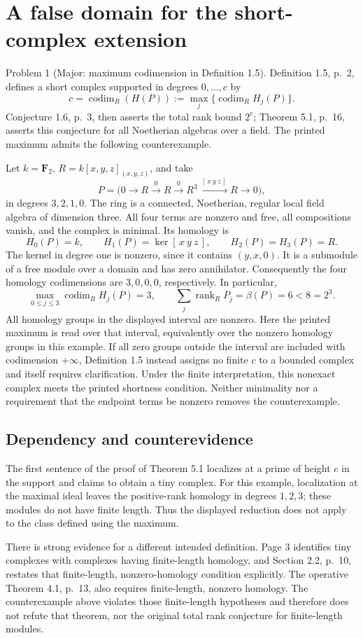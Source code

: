 \documentclass[10pt]{article}
\begin{document}
\section*{A false domain for the short-complex extension}
Problem 1 (Major: maximum codimension in Definition 1.5).  Definition 1.5, p. 2, defines a short complex supported in degrees \(0,\ldots,c\) by \[c=\operatorname{codim}_R(H(P)):=\max_j\{\operatorname{codim}_R H_j(P)\}.\] Conjecture 1.6, p. 3, then asserts the total rank bound \(2^c\); Theorem 5.1, p. 16, asserts this conjecture for all Noetherian algebras over a field. The printed maximum admits the following counterexample.\par
Let \(k=\mathbf F_2\), \(R=k[x,y,z]_{(x,y,z)}\), and take \[P=\bigl(0\longrightarrow R
       \xrightarrow{\,0\,}R
       \xrightarrow{\,0\,}R^3
       \xrightarrow{\,[\,x\ y\ z\,]\,}R
       \longrightarrow0\bigr),\] in degrees \(3,2,1,0\). The ring is a connected, Noetherian, regular local field algebra of dimension three. All four terms are nonzero and free, all compositions vanish, and the complex is minimal. Its homology is \[H_0(P)=k,\qquad
 H_1(P)=\ker[\,x\ y\ z\,],\qquad
 H_2(P)=H_3(P)=R.\] The kernel in degree one is nonzero, since it contains \((y,x,0)\). It is a submodule of a free module over a domain and has zero annihilator. Consequently the four homology codimensions are \(3,0,0,0\), respectively. In particular, \[\max_{0\le j\le3}\operatorname{codim}_RH_j(P)=3,\qquad
 \sum_j\operatorname{rank}_RP_j=\beta(P)=6<8=2^3.\] All homology groups in the displayed interval are nonzero. Here the printed maximum is read over that interval, equivalently over the nonzero homology groups in this example. If all zero groups outside the interval are included with codimension \(+\infty\), Definition 1.5 instead assigns no finite \(c\) to a bounded complex and itself requires clarification. Under the finite interpretation, this nonexact complex meets the printed shortness condition. Neither minimality nor a requirement that the endpoint terms be nonzero removes the counterexample.\par
\subsection*{Dependency and counterevidence}
The first sentence of the proof of Theorem 5.1 localizes at a prime of height \(c\) in the support and claims to obtain a tiny complex. For this example, localization at the maximal ideal leaves the positive-rank homology in degrees \(1,2,3\); these modules do not have finite length. Thus the displayed reduction does not apply to the class defined using the maximum.\par
There is strong evidence for a different intended definition. Page 3 identifies tiny complexes with complexes having finite-length homology, and Section 2.2, p. 10, restates that finite-length, nonzero-homology condition explicitly. The operative Theorem 4.1, p. 13, also requires finite-length, nonzero homology. The counterexample above violates those finite-length hypotheses and therefore does not refute that theorem, nor the original total rank conjecture for finite-length modules.\par
\end{document}
